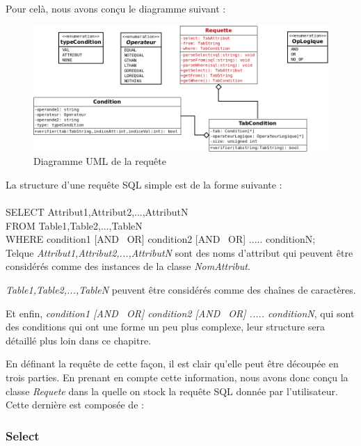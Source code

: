 \documentclass[oneside,13pt,a4paper]{report}
\begin{document}
Pour celà, nous avons conçu le diagramme suivant :

\vfill

\begin{figure}[!h]
	\centering
	\includegraphics[width=1\textwidth]{img/requette.png}
	\vspace{0.1cm}
	\caption{Diagramme UML de la requête}
\end{figure}

\pagebreak

La structure d'une requête SQL simple est de la forme suivante : \\
\\SELECT Attribut1,Attribut2,...,AttributN\\FROM Table1,Table2,...,TableN\\WHERE condition1 [AND \textbar~OR] condition2 [AND \textbar~OR] ..... conditionN;\\

Telque \textit{Attribut1,Attribut2,...,AttributN} sont des noms d'attribut qui peuvent être considérés comme des instances de la classe \textit{NomAttribut}.

\textit{Table1,Table2,...,TableN} peuvent être  considérés comme des chaînes de caractères.

Et enfin, \textit{condition1 [AND \textbar~OR] condition2 [AND \textbar~OR] ..... conditionN}, qui sont des conditions qui ont une forme un peu plus complexe, leur structure sera détaillé plus loin dans ce chapitre.

En définant la requête de cette façon, il est clair qu'elle peut être découpée en trois parties. En prenant en compte cette information, nous avons donc conçu la classe 
\textit{Requete} dans la quelle on stock la requête SQL donnée par l'utilisateur. Cette dernière est composée de : 

\subsubsection{Select}
\end{document}
